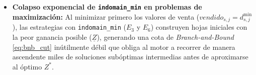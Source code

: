 \begin{itemize}
    \item \textbf{Colapso exponencial de \texttt{indomain\_min} en problemas de maximización:}
    Al minimizar primero los valores de venta ($vendido_{s,j} = d^{\min}_{s,j}$), las estrategias con \texttt{indomain\_min} ($E_3$ y $E_6$) construyen hojas iniciales con la peor ganancia posible ($\underline{Z}$), generando una cota de \emph{Branch-and-Bound} \eqref{eq:bnb_cut} inútilmente débil que obliga al motor a recorrer de manera ascendente miles de soluciones subóptimas intermedias antes de aproximarse al óptimo $Z^*$.
\end{itemize}
